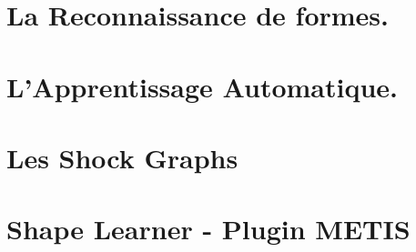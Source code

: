 \documentclass[12pt,a4paper,utf8x, combine]{report}
\begin{document}
\makeatletter
\renewcommand{\@chapapp}{}%
\newenvironment{chapquote}[2][2em]
  {\setlength{\@tempdima}{#1}%
   \def\chapquote@author{#2}%
   \parshape 1 \@tempdima \dimexpr\textwidth-2\@tempdima\relax%
   \itshape}
  {\par\normalfont\hfill--\ \chapquote@author\hspace*{\@tempdima}\par\bigskip}
\makeatother







\tableofcontents
\listoffigures
\clearpage










\chapter{La Reconnaissance de formes.}


\chapter{L'Apprentissage Automatique.}


\clearpage

\chapter{Les Shock Graphs}

\clearpage

\chapter{Shape Learner - Plugin METIS}





\nocite{*}
\end{document}
